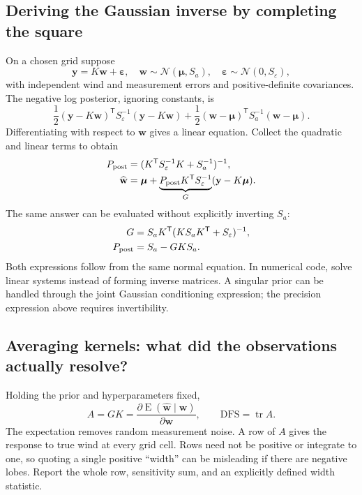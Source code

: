 \subsection{Deriving the Gaussian inverse by completing the square}
On a chosen grid suppose
\begin{equation}
 \mathbf y=K\mathbf w+\boldsymbol\varepsilon,
 \quad \mathbf w\sim\mathcal N(\boldsymbol\mu,S_a),
 \quad \boldsymbol\varepsilon\sim\mathcal N(0,S_\varepsilon),
\end{equation}
with independent wind and measurement errors and positive-definite covariances. The negative log posterior, ignoring constants, is
\begin{equation}
 \frac12(\mathbf y-K\mathbf w)^{\mathsf T}S_\varepsilon^{-1}(\mathbf y-K\mathbf w)
 +\frac12(\mathbf w-\boldsymbol\mu)^{\mathsf T}S_a^{-1}(\mathbf w-\boldsymbol\mu).
\end{equation}
Differentiating with respect to $\mathbf w$ gives a linear equation. Collect the quadratic and linear terms to obtain
\begin{align}
 P_{\rm post}&=(K^{\mathsf T}S_\varepsilon^{-1}K+S_a^{-1})^{-1},\\
 \widehat{\mathbf w}&=\boldsymbol\mu+
 \underbrace{P_{\rm post}K^{\mathsf T}S_\varepsilon^{-1}}_G
 (\mathbf y-K\boldsymbol\mu).
\end{align}
The same answer can be evaluated without explicitly inverting $S_a$:
\begin{align}
 G&=S_aK^{\mathsf T}(KS_aK^{\mathsf T}+S_\varepsilon)^{-1},\\
 P_{\rm post}&=S_a-GKS_a.
\end{align}
Both expressions follow from the same normal equation. In numerical code, solve linear systems instead of forming inverse matrices. A singular prior can be handled through the joint Gaussian conditioning expression; the precision expression above requires invertibility.

\subsection{Averaging kernels: what did the observations actually resolve?}
Holding the prior and hyperparameters fixed,
\begin{equation}
 \boxed{A=GK=\frac{\partial\operatorname E(\widehat{\mathbf w}\mid\mathbf w)}{\partial\mathbf w},
 \qquad \mathrm{DFS}=\operatorname{tr}A.}
\end{equation}
The expectation removes random measurement noise. A row of $A$ gives the response to true wind at every grid cell. Rows need not be positive or integrate to one, so quoting a single positive ``width'' can be misleading if there are negative lobes. Report the whole row, sensitivity sum, and an explicitly defined width statistic.

